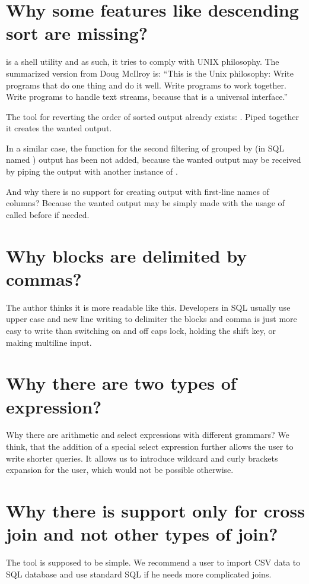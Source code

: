 \section{Why some features like descending sort are missing?}
 is a shell utility and as such, it tries to comply with UNIX philosophy. 
The summarized version from Doug McIlroy is: ``This is the Unix philosophy: Write programs that do one thing and do it well. Write programs to work together. 
Write programs to handle text streams, because that is a universal interface.'' \cite{unix-philosophy}

The tool for reverting the order of sorted output already exists: . Piped together it creates the wanted output.

In a similar case, the function for the second filtering of grouped by (in SQL named ) 
output has been not added, because the wanted output
may be received by piping the output with another instance of .

And why there is no support for creating output with first-line names of columns? Because the wanted output
may be simply made with the usage of  called before  if needed.

\section{Why blocks are delimited by commas?}
The author thinks it is more readable like this. Developers in SQL usually use upper case and new line writing to delimiter the blocks and comma is just more easy to write than switching on and off caps lock, 
holding the shift key, or making multiline input.

\section{Why there are two types of expression?}
Why there are arithmetic and select expressions with different grammars?
We think, that the addition of a special select expression further allows the user to write shorter queries.
It allows us to introduce wildcard and curly brackets expansion for the user, which would not be possible otherwise.

\section{Why there is support only for cross join and not other types of join?}
The tool is supposed to be simple. We recommend a user to import CSV data to SQL database and use standard SQL if he needs more complicated joins.

